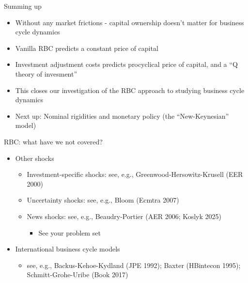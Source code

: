 \documentclass[9pt,xcolor={dvipsnames}]{beamer}
\newcommand{\bit}{\begin{itemize}}
\newcommand{\eit}{\end{itemize}}
\begin{document}
\begin{frame}{Summing up}

\bit
\setlength\itemsep{1.5em}

\item Without any market frictions - capital ownership doesn't matter for business cycle dynamics

\item Vanilla RBC predicts a constant price of capital

\item Investment adjustment costs predicts procyclical price of capital, and a ``Q theory of invesment''

\item This closes our investigation of the RBC approach to studying business cycle dynamics

\item Next up: Nominal rigidities and monetary policy (the ``New-Keynesian'' model)
\eit

\end{frame}




\begin{frame}{RBC: what have we not covered?}

\bit
\setlength\itemsep{1.5em}
\item Other shocks
\bit
\setlength\itemsep{0.5em}
\item Investment-specific shocks: see, e.g., Greenwood-Hersowitz-Krusell (EER 2000)

\item Uncertainty shocks: see, e.g., Bloom (Ecmtra 2007)

\item News shocks: see, e.g., Beaudry-Portier (AER 2006; Koslyk 2025)
\bit
	\item See your problem set
\eit
\eit

\item International business cycle models
\bit
\setlength\itemsep{0.5em}
\item see, e.g., Backus-Kehoe-Kydland (JPE 1992); Baxter (HBintecon 1995); Schmitt-Grohe-Uribe (Book 2017)
\eit

\eit

\end{frame}
\end{document}
